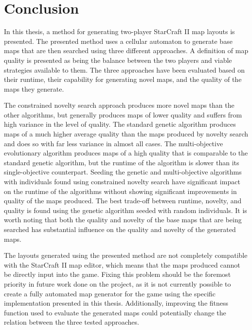 \chapter{Conclusion}
\label{conclusion}
In this thesis, a method for generating two-player StarCraft II map layouts is presented. The presented method uses a cellular automaton to generate base maps that are then searched using three different approaches. A definition of map quality is presented as being the balance between the two players and viable strategies available to them. The three approaches have been evaluated based on their runtime, their capability for generating novel maps, and the quality of the maps they generate.

The constrained novelty search approach produces more novel maps than the other algorithms, but generally produces maps of lower quality and suffers from high variance in the level of quality. The standard genetic algorithm produces maps of a much higher average quality than the maps produced by novelty search and does so with far less variance in almost all cases. The multi-objective evolutionary algorithm produces maps of a high quality that is comparable to the standard genetic algorithm, but the runtime of the algorithm is slower than its single-objective counterpart. Seeding the genetic and multi-objective algorithms with individuals found using constrained novelty search have significant impact on the runtime of the algorithms without showing significant improvements in quality of the maps produced. The best trade-off between runtime, novelty, and quality is found using the genetic algorithm seeded with random individuals. It is worth noting that both the quality and novelty of the base maps that are being searched has substantial influence on the quality and novelty of the generated maps.

The layouts generated using the presented method are not completely compatible with the StarCraft II map editor, which means that the maps produced cannot be directly input into the game. Fixing this problem should be the foremost priority in future work done on the project, as it is not currently possible to create a fully automated map generator for the game using the specific implementation presented in this thesis. Additionally, improving the fitness function used to evaluate the generated maps could potentially change the relation between the three tested approaches.